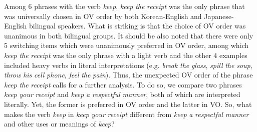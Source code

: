 \begin{table}
\caption{Item-based analysis for \textit{keep} in Korean-English code-switching
(n$^0$ of occurrence 0–4: \textsc{OV} biased; 5–9: not biased; 10–14: \textsc{VO} biased)
}
\label{tab:5.5}
\end{table}

\largerpage
Among 6 phrases with the verb \textit{keep}, \textit{keep} \textit{the} \textit{receipt} was the only phrase that was universally chosen in \ac{OV} order by both Korean-English and Japanese-English bilingual speakers. What is striking is that the choice of \ac{OV} order was unanimous in both bilingual groups. It should be also noted that there were only 5 switching items which were unanimously preferred in \ac{OV} order, among which \textit{keep} \textit{the} \textit{receipt} was the only phrase with a light verb and the other 4 examples included heavy verbs in literal interpretations (e.g. \textit{break} \textit{the} \textit{glass}, \textit{spill} \textit{the} \textit{soup}, \textit{throw} \textit{his} \textit{cell} \textit{phone}, \textit{feel} \textit{the} \textit{pain}). Thus, the unexpected \ac{OV} order of the phrase \textit{keep} \textit{the} \textit{receipt} calls for a further analysis. To do so, we compare two phrases \textit{keep} \textit{your} \textit{receipt} and \textit{keep} \textit{a} \textit{respectful} \textit{manner}, both of which are interpreted literally. Yet, the former is preferred in \ac{OV} order and the latter in \ac{VO}. So, what makes the verb \textit{keep} in \textit{keep} \textit{your} \textit{receipt} different from \textit{keep} \textit{a} \textit{respectful} \textit{manner} and other uses or meanings of \textit{keep}? 

